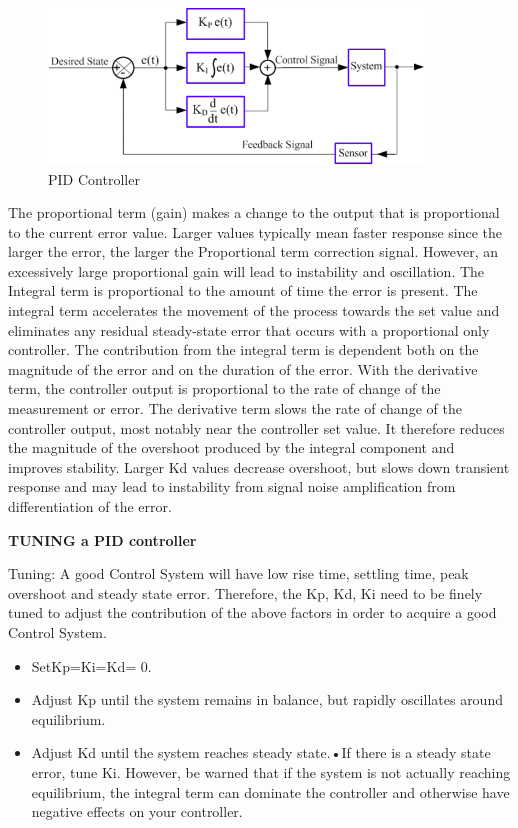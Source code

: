 \documentclass{article}
\begin{document}
 	
 	\begin{figure}[h]
 		\centering
 		\includegraphics[width=100mm,scale=0.5]{PIDcontrol}
 		\caption{PID Controller}
 		\label{ PID Controller}
 	\end{figure}
 	
 	The proportional term (gain) makes a change to the output that is proportional to the current error value. Larger values typically mean faster response since the larger the error, the larger the Proportional term correction signal. However, an excessively large proportional gain will lead to instability and oscillation.
 	The Integral term is proportional to the amount of time the error is present. The integral term accelerates the movement of the process towards the set value and eliminates any residual steady-state error that occurs with a proportional only controller. The contribution from the integral term is dependent both on the magnitude of the error and on the duration of the error.
 	With the derivative term, the controller output is proportional to the rate of change of the measurement or error. The derivative term slows the rate of change of the controller output, most notably near the controller set value. It therefore reduces the magnitude of the overshoot produced by the integral component and improves stability. Larger Kd values decrease overshoot, but slows down transient response and may lead to instability from signal noise amplification from differentiation of the error.\\	
 		
 	
	\pagebreak
 
 	\textbf{TUNING a PID controller}
 	
 	Tuning: A good Control System will have low rise time, settling time, peak overshoot and steady state error. Therefore, the Kp, Kd, Ki need to be ﬁnely tuned to adjust the contribution of the above factors in order to acquire a good Control System.
 	
 	\begin{itemize}
 	\item SetKp=Ki=Kd= 0.
 	\item Adjust Kp until the system remains in balance, but rapidly oscillates around equilibrium.
 	\item Adjust Kd until the system reaches steady state.•If there is a steady state error, tune Ki. However, be warned that if the system is not actually reaching equilibrium, the integral term can dominate the controller and otherwise have negative effects on your controller.
 	\end{itemize}
 
\end{document}
